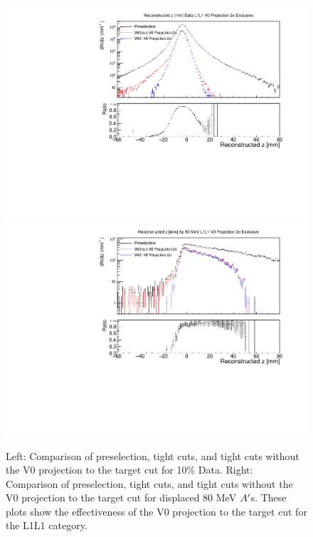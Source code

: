 \begin{figure}[!ht] 
    \centering
    \includegraphics[width=.45\textwidth]{figs/selection/voproj_n_1_z.pdf}
    \includegraphics[width=.45\textwidth]{figs/selection/ap_80MeV_v0proj_n_1_z.pdf}
    \caption{
    	Left: Comparison of preselection, tight cuts, and tight cuts without the V0 projection to the target cut for 10\% Data. Right: Comparison of preselection, tight cuts, and tight cuts without the V0 projection to the target cut for displaced 80 MeV $A^\prime$s. These plots show the effectiveness of the V0 projection to the target cut for the L1L1 category.
    }
    \label{fig:v0proj_L1L1}
\end{figure}  


